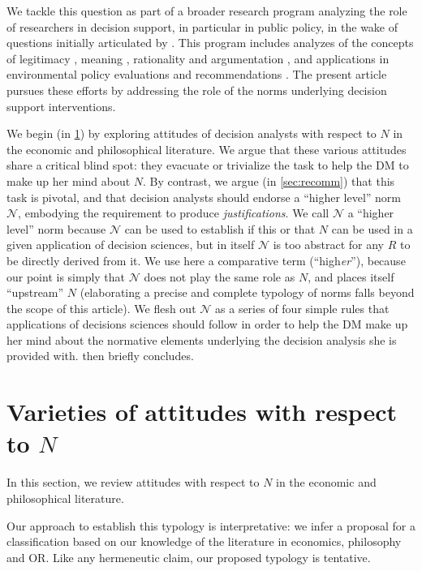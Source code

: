 \documentclass[preprint, french, english, 11pt, authoryear]{elsarticle}%
\newcommand{\protectforpdf}[1]{\texorpdfstring{\ensuremath{#1}}{#1}}
\newcommand{\adv}{\mathscr{N}}
\begin{document}
\begin{changebar}
We tackle this question as part of a broader research program analyzing the role of researchers in decision support, in particular in public policy, in the wake of questions initially articulated by \citet{tsoukias_policy_2013}.
This program includes analyzes of the concepts of legitimacy \citep{meinard_what_2017}, meaning \citep{meinard_utility_2018}, rationality \citep{meinard_rationality_2019} and argumentation \citep{cailloux_formal_2018}, and applications in environmental policy evaluations \citep{jeanmougin_mismatch_2017} and recommendations \citep{choulak_meta-decision-analysis_2019}.
The present article pursues these efforts by addressing the role of the norms underlying decision support interventions.\end{changebar}

We begin (in \cref{sec:existing}) by exploring attitudes of decision analysts with respect to $N$ in the economic and philosophical literature. 
We argue that these various attitudes share a critical blind spot: they evacuate or trivialize the task to help the \ac{DM} to make up her mind about $N$. 
By contrast, we argue (in \cref{sec:recomm}) that this task is pivotal, and that decision analysts should endorse a “higher level” norm $\adv$, embodying the requirement to produce \emph{justifications}. We call $\adv$ a “higher level” norm because $\adv$ can be used to establish if this or that $N$ can be used in a given application of decision sciences, but in itself $\adv$ is too abstract for any $R$ to be directly derived from it.
We use here a comparative term (“high\emph{er}”), because our point is simply that $\adv$ does not play the same role as $N$, and places itself “upstream” $N$ (elaborating a precise and complete typology of norms falls beyond the scope of this article).
We flesh out $\adv$ as a series of four simple rules that applications of decisions sciences should follow in order to help the \ac{DM} make up her mind about the normative elements underlying the decision analysis she is provided with.  then briefly concludes.

\section{Varieties of attitudes with respect to \protectforpdf{N}}
\label{sec:existing}
In this section, we review attitudes with respect to $N$ in the economic and philosophical literature.
\begin{changebar}
Our approach to establish this typology is interpretative: we infer a proposal for a classification based on our knowledge of the literature in economics, philosophy and OR.
Like any hermeneutic claim, our proposed typology is tentative.\end{changebar}
\end{document}

